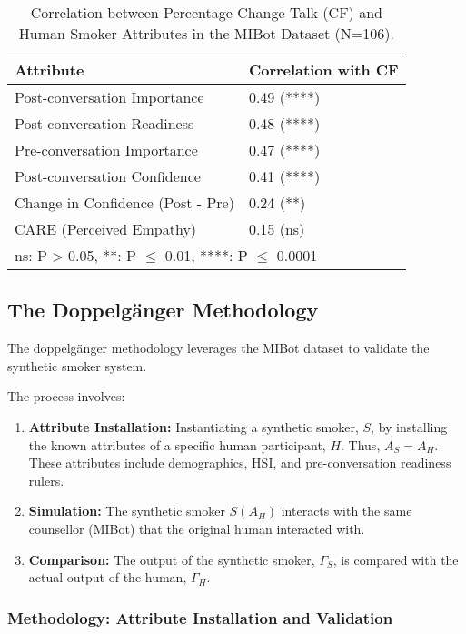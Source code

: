 \begin{table}[h!]
\centering
\caption{Correlation between Percentage Change Talk (CF) and Human Smoker Attributes in the MIBot Dataset (N=106).}
\label{tab:ct-correlation}
\begin{tabular}{@{}ll@{}}
\toprule
\textbf{Attribute} & \textbf{Correlation with CF} \\ \midrule
Post-conversation Importance & 0.49 (****) \\
Post-conversation Readiness & 0.48 (****) \\
Pre-conversation Importance & 0.47 (****) \\
Post-conversation Confidence & 0.41 (****) \\
Change in Confidence (Post - Pre) & 0.24 (**) \\
CARE (Perceived Empathy) & 0.15 (ns) \\
\bottomrule
\multicolumn{2}{l}{\footnotesize{ns: P > 0.05, **: P $\le$ 0.01, ****: P $\le$ 0.0001}}
\end{tabular}
\end{table}

\subsection{The Doppelgänger Methodology}

The doppelgänger methodology leverages the MIBot dataset to validate the synthetic smoker system.

The process involves:
\begin{enumerate}
    \item \textbf{Attribute Installation:} Instantiating a synthetic smoker, $S$, by installing the known attributes of a specific human participant, $H$. Thus, $A_S = A_H$. These attributes include demographics, HSI, and pre-conversation readiness rulers.
    \item \textbf{Simulation:} The synthetic smoker $S(A_H)$ interacts with the same counsellor (MIBot) that the original human interacted with.
    \item \textbf{Comparison:} The output of the synthetic smoker, $\Gamma_S$, is compared with the actual output of the human, $\Gamma_H$.
\end{enumerate}

\subsubsection{Methodology: Attribute Installation and Validation}

